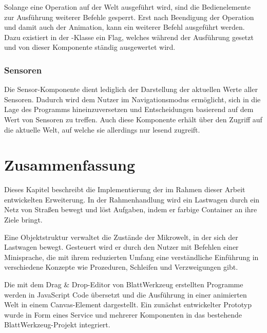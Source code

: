 Solange eine Operation auf der Welt ausgeführt wird, sind die Bedienelemente zur Ausführung weiterer Befehle gesperrt. Erst nach Beendigung der Operation und damit auch der Animation, kann ein weiterer Befehl ausgeführt werden. Dazu existiert in der -Klasse ein Flag, welches während der Ausführung gesetzt und von dieser Komponente ständig ausgewertet wird.

\subsubsection{Sensoren}
\label{sec:implementation:integration:sensors}

Die Sensor-Komponente dient lediglich der Darstellung der aktuellen Werte aller Sensoren. Dadurch wird dem Nutzer im Navigationsmodus ermöglicht, sich in die Lage des Programms hineinzuversetzen und Entscheidungen basierend auf dem Wert von Sensoren zu treffen. Auch diese Komponente erhält über den  Zugriff auf die aktuelle Welt, auf welche sie allerdings nur lesend zugreift.

\section{Zusammenfassung}
\label{sec:implementation:summary}

Dieses Kapitel beschreibt die Implementierung der im Rahmen dieser Arbeit entwickelten Erweiterung. In der Rahmenhandlung wird ein Lastwagen durch ein Netz von Straßen bewegt und löst Aufgaben, indem er farbige Container an ihre Ziele bringt.

Eine Objektstruktur verwaltet die Zustände der Mikrowelt, in der sich der Lastwagen bewegt. Gesteuert wird er durch den Nutzer mit Befehlen einer Minisprache, die mit ihrem reduzierten Umfang eine verständliche Einführung in verschiedene Konzepte wie Prozeduren, Schleifen und Verzweigungen gibt.

Die mit dem Drag \& Drop-Editor von BlattWerkzeug erstellten Programme werden in JavaScript Code übersetzt und die Ausführung in einer animierten Welt in einem Canvas-Element dargestellt. Ein zunächst entwickelter Prototyp wurde in Form eines Service und mehrerer Komponenten in das bestehende BlattWerkzeug-Projekt integriert.
